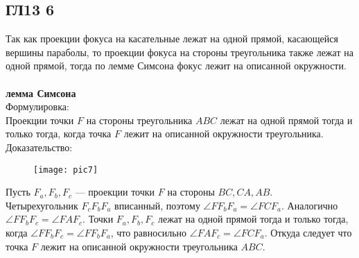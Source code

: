 \subsection*{ГЛ13 6}
Так как проекции фокуса на касательные лежат на одной прямой, касающейся вершины параболы, то проекции фокуса на стороны треугольника также лежат на одной прямой, тогда по лемме Симсона фокус лежит на описанной окружности.\\
\\
\textbf{лемма Симсона}\\
Формулировка:\\
Проекции точки $F$ на стороны треугольника $ABC$ лежат на одной прямой тогда и только тогда, когда точка $F$ лежит на описанной окружности треугольника.\\
Доказательство:\\
\begin{figure}[h]
	\texttt{[image: pic7]}
\end{figure}
Пусть $F_a, F_b, F_c$ –– проекции точки $F$ на стороны $BC, CA, AB$.\\
Четырехугольник $F_cF_bF_a$ вписанный, поэтому $\angle FF_bF_a = \angle FCF_a$. Аналогично $\angle FF_bF_c = \angle FAF_c$. Точки $F_a, F_b, F_c$ лежат на одной прямой тогда и только тогда, когда $\angle FF_bF_c = \angle FF_bF_a$, что равносильно $\angle FAF_c = \angle FCF_a$. Откуда следует что точка $F$ лежит на описанной окружности треугольника $ABC$. 
		